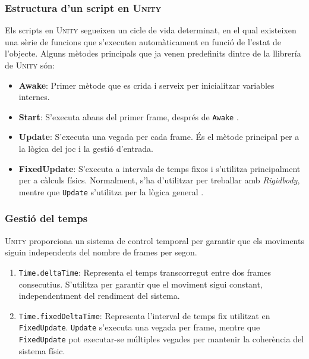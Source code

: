 \documentclass[a4paper,11pt,DIV=13,headings=normal,abstract=true,twoside=semi]{article}
\newcommand{\acro}[1]{\textsc{#1}}
\begin{document}
\subsubsection{Estructura d'un script en \acro{Unity}}

Els scripts en \acro{Unity} segueixen un cicle de vida determinat, en el qual existeixen una sèrie de funcions que s'executen automàticament en funció de l'estat de l'objecte. Alguns mètodes principals que ja venen predefinits dintre de la llibrería de \acro{Unity} són:

\begin{itemize}
    \item \textbf{Awake}: Primer mètode que es crida i serveix per inicialitzar variables internes.
    \item \textbf{Start}:  S'executa abans del primer frame, després de \texttt{Awake} \cite{UnityExecutionOrder}.
    \item \textbf{Update}:  S'executa una vegada per cada frame. És el mètode principal per a la lògica del joc i la gestió d'entrada.
    \item \textbf{FixedUpdate}:  S'executa a intervals de temps fixos i s'utilitza principalment per a càlculs físics. Normalment, s'ha d'utilitzar per treballar amb \emph{Rigidbody}, mentre que \texttt{Update} s'utilitza per la lògica general \cite{UnityUpdate}.
\end{itemize}

\subsubsection{Gestió del temps}

\acro{Unity} proporciona un sistema de control temporal \cite{UnityTime} per garantir que els moviments siguin independents del nombre de frames per segon.

\begin{enumerate}
    \item \texttt{Time.deltaTime}: Representa el temps transcorregut entre dos frames consecutius. S'utilitza per garantir que el moviment sigui constant, independentment del rendiment del sistema.
    \item \texttt{Time.fixedDeltaTime}: Representa l'interval de temps fix utilitzat en \texttt{FixedUpdate}. \texttt{Update} s'executa una vegada per frame, mentre que \texttt{FixedUpdate} pot executar-se múltiples vegades per mantenir la coherència del sistema físic. \cite{UnityUpdate}
\end{enumerate}
\end{document}
